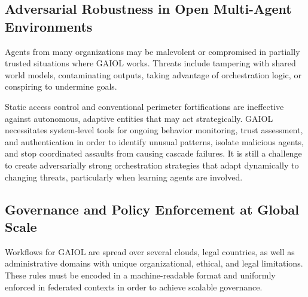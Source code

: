 \documentclass[final,5p,times,twocolumn,authoryear,draft]{elsarticle}
\begin{document}
\subsection{Adversarial Robustness in Open Multi-Agent Environments}

Agents from many organizations may be malevolent or compromised in partially trusted situations where GAIOL works. Threats include tampering with shared world models, contaminating outputs, taking advantage of orchestration logic, or conspiring to undermine goals.

Static access control and conventional perimeter fortifications are ineffective against autonomous, adaptive entities that may act strategically. GAIOL necessitates system-level tools for ongoing behavior monitoring, trust assessment, and authentication in order to identify unusual patterns, isolate malicious agents, and stop coordinated assaults from causing cascade failures. It is still a challenge to create adversarially strong orchestration strategies that adapt dynamically to changing threats, particularly when learning agents are involved.




\subsection{Governance and Policy Enforcement at Global Scale}

Workflows for GAIOL are spread over several clouds, legal countries, as well as administrative domains with unique organizational, ethical, and legal limitations. These rules must be encoded in a machine-readable format and uniformly enforced in federated contexts in order to achieve scalable governance.
\end{document}
